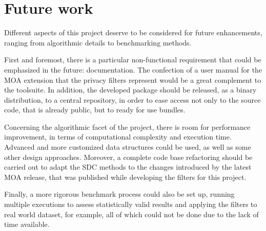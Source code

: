 \section{Future work}
\label{Conclusions:Future}

Different aspects of this project deserve to be considered for future enhancements, ranging from algorithmic details to benchmarking methods.

First and foremost, there is a particular non-functional requirement that could be emphasized in the future: documentation. The confection of a user manual for the MOA extension that the privacy filters represent would be a great complement to the toolsuite. In addition, the developed package should be released, as a binary distribution, to a central repository, in order to ease access not only to the source code, that is already public, but to ready for use bundles.

Concerning the algorithmic facet of the project, there is room for performance improvement, in terms of computational complexity and execution time. Advanced and more customized data structures could be used, as well as some other design approaches. Moreover, a complete code base refactoring should be carried out to adapt the SDC methods to the changes introduced by the latest MOA release, that was published while developing the filters for this project.

Finally, a more rigorous benchmark process could also be set up, running multiple executions to assess statistically valid results and applying the filters to real world dataset, for example, all of which could not be done due to the lack of time available.